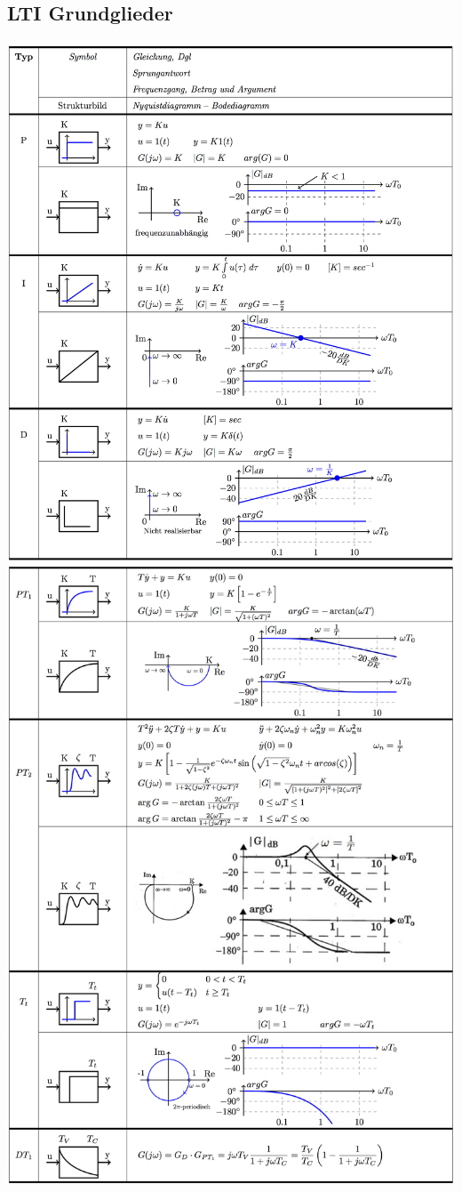   \subsection{LTI Grundglieder}
  \begin{center}
      \includegraphics[width=16cm]{./images/LTIGrundGlieder1.png}
      \clearpage
       \includegraphics[width=16cm]{./images/LTIGrundGlieder2.png}
    \end{center}
      
  